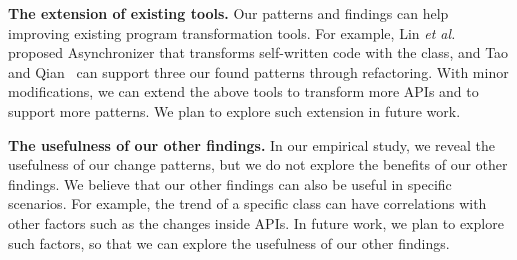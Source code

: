\noindent
\textbf{The extension of existing tools.} Our patterns and findings can help improving existing program transformation tools. For example,  Lin \emph{et al.}~\cite{conf/sigsoft/LinRD14} proposed Asynchronizer that transforms self-written code with the  class, and Tao and Qian~\cite{tao2014refactoring} can support three our found patterns through refactoring. With minor modifications, we can extend the above tools to transform more APIs and to support more patterns. We plan to explore such extension in future work.

\noindent
\textbf{The usefulness of our other findings.} In our empirical study, we reveal the usefulness of our change patterns, but we do not explore the benefits of our other findings. We believe that our other findings can also be useful in specific scenarios. For example, the trend of a specific class can have correlations with other factors such as the changes inside APIs. In future work, we plan to explore such factors, so that we can explore the usefulness of our other findings.
